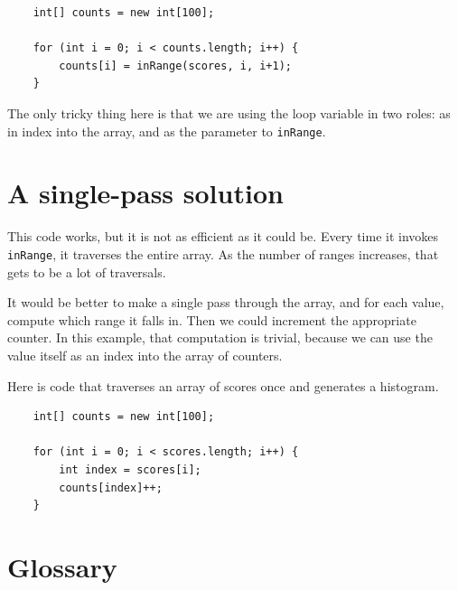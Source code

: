 \documentclass[12pt]{book}
\theoremstyle{exercise}
\begin{document}
\begin{lstlisting}
    int[] counts = new int[100];

    for (int i = 0; i < counts.length; i++) {
        counts[i] = inRange(scores, i, i+1);
    }
\end{lstlisting}
%
The only tricky thing here is that we are using the loop variable
in two roles: as in index into the array, and as the parameter to
{\tt inRange}.


\section{A single-pass solution}
\label{singlepass}

This code works, but it is not as efficient as it could
be.  Every time it invokes {\tt inRange}, it traverses the
entire array.  As the number of ranges increases, that gets
to be a lot of traversals.

It would be better to make a single pass through the array,
and for each value, compute which range it falls in.  Then
we could increment the appropriate counter.
In this example, that computation is trivial, because we
can use the value itself as an index into the array of counters.

Here is code that traverses an array of scores once and generates
a histogram.

\begin{lstlisting}
    int[] counts = new int[100];

    for (int i = 0; i < scores.length; i++) {
        int index = scores[i];
        counts[index]++;
    }
\end{lstlisting}


\section{Glossary}
\end{document}
